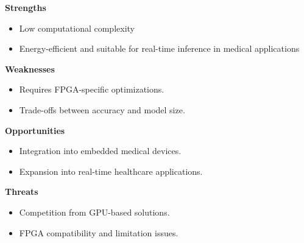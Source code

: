 \begin{minipage}{\textwidth}
    \begin{minipage}{0.49\textwidth}
        \begin{tcolorbox}[colframe=black, colback=green!10, boxrule=0.5pt, boxsep=5pt, left=5pt, right=5pt, top=5pt, bottom=5pt, height=3cm]
            \textbf{Strengths}
            \begin{itemize}
                \item Low computational complexity
                \item Energy-efficient and suitable for real-time inference in medical applications
            \end{itemize}
        \end{tcolorbox}
    \end{minipage}
    \hfill
    \begin{minipage}{0.49\textwidth}
        \begin{tcolorbox}[colframe=black, colback=red!10, boxrule=0.5pt, boxsep=5pt, left=5pt, right=5pt, top=5pt, bottom=5pt, height=3cm]
            \textbf{Weaknesses}
            \begin{itemize}
                \item Requires FPGA-specific optimizations.
                \item Trade-offs between accuracy and model size.
            \end{itemize}
        \end{tcolorbox}
    \end{minipage}

    \vspace{0.3cm}
    
    \begin{minipage}{0.49\textwidth}
        \begin{tcolorbox}[colframe=black, colback=blue!10, boxrule=0.5pt, boxsep=5pt, left=5pt, right=5pt, top=5pt, bottom=5pt, height=3cm]
            \textbf{Opportunities}
            \begin{itemize}
                \item Integration into embedded medical devices.
                \item Expansion into real-time healthcare applications.
            \end{itemize}
        \end{tcolorbox}
    \end{minipage}
    \hfill
    \begin{minipage}{0.49\textwidth}
        \begin{tcolorbox}[colframe=black, colback=yellow!10, boxrule=0.5pt, boxsep=5pt, left=5pt, right=5pt, top=5pt, bottom=5pt, height=3cm]
            \textbf{Threats}
            \begin{itemize}
                \item Competition from GPU-based solutions.
                \item FPGA compatibility and limitation issues.
            \end{itemize}
        \end{tcolorbox}
    \end{minipage}
\end{minipage}

